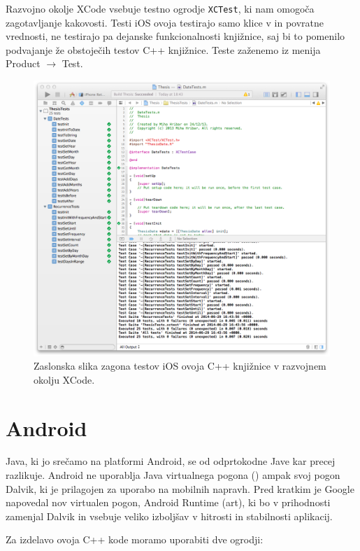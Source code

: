 Razvojno okolje XCode vsebuje testno ogrodje \texttt{XCTest}, ki nam omogoča zagotavljanje kakovosti. Testi iOS ovoja testirajo samo klice v in povratne vrednosti, ne testirajo pa dejanske funkcionalnosti knjižnice, saj bi to pomenilo podvajanje že obstoječih testov C++ knjižnice. Teste zaženemo iz menija Product $\rightarrow$ Test.

\begin{figure}
 \includegraphics[width=\linewidth]{xcode-tests}
 \caption{Zaslonska slika zagona testov iOS ovoja C++ knjižnice v razvojnem okolju XCode.}
 \label{fig:xcode-tests}
\end{figure}

\section{Android}

Java, ki jo srečamo na platformi Android, se od odprtokodne Jave kar precej razlikuje. Android ne uporablja Java virtualnega pogona () ampak svoj pogon Dalvik, ki je prilagojen za uporabo na mobilnih napravh. Pred kratkim je Google napovedal nov virtualen pogon, Android Runtime (\gls{art}), ki bo v prihodnosti zamenjal Dalvik in vsebuje veliko izboljšav v hitrosti in stabilnosti aplikacij.

Za izdelavo ovoja C++ kode moramo uporabiti dve ogrodji:


